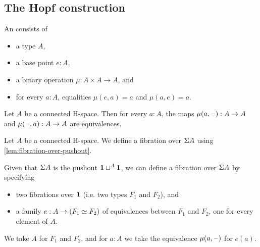 \documentclass[hott-all.tex]{subfiles}
\begin{document}
\subsection{The Hopf construction}
% 
\begin{defn}
  An 
  consists of
  \begin{itemize}
  \item a type $A$,
  \item a base point $e:A$,
  \item a binary operation $\mu:A\times A\to A$, and
  \item for every $a:A$, equalities $\mu(e,a)=a$ and $\mu(a,e)=a$.
  \end{itemize}
\end{defn}
% 
\begin{lem}
  Let $A$ be a connected H-space. Then for every $a:A$, the maps $\mu(a,\mathord{\hspace{1pt}\text{--}\hspace{1pt}}):A\to
  A$ and $\mu(\mathord{\hspace{1pt}\text{--}\hspace{1pt}},a):A\to A$ are equivalences.
\end{lem}
% 
% 
% 
% 
\begin{defn}
  Let $A$ be a connected H-space. We define a fibration over $\Sigma A$ using
  \cref{lem:fibration-over-pushout}.

  Given that $\Sigma A$ is the pushout $\mathbf{1}\sqcup^A\mathbf{1}$, we can define a
  fibration over $\Sigma A$ by specifying
  \begin{itemize}
  \item two fibrations over $\mathbf{1}$ (i.e. two types $F_1$ and $F_2$), and
  \item a family $e:A\to(F_1 \simeq F_2)$ of equivalences between
    $F_1$ and $F_2$, one for every element of $A$.
  \end{itemize}
  We take $A$ for $F_1$ and $F_2$, and for $a:A$ we take the equivalence
  $\mu(a,\mathord{\hspace{1pt}\text{--}\hspace{1pt}})$ for $e(a)$.
\end{defn}
\end{document}
